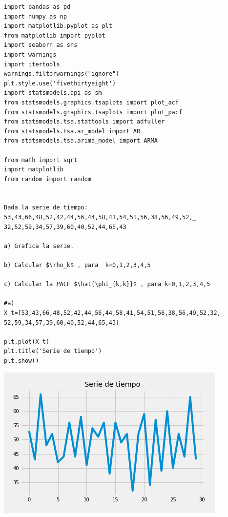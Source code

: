 \documentclass{article}
\begin{document}
\begin{verbatim}
import pandas as pd
import numpy as np
import matplotlib.pyplot as plt
from matplotlib import pyplot
import seaborn as sns
import warnings
import itertools
warnings.filterwarnings("ignore")
plt.style.use('fivethirtyeight')
import statsmodels.api as sm
from statsmodels.graphics.tsaplots import plot_acf
from statsmodels.graphics.tsaplots import plot_pacf
from statsmodels.tsa.stattools import adfuller
from statsmodels.tsa.ar_model import AR
from statsmodels.tsa.arima_model import ARMA

from math import sqrt
import matplotlib
from random import random


Dada la serie de tiempo:
53,43,66,48,52,42,44,56,44,58,41,54,51,56,38,56,49,52,_
32,52,59,34,57,39,60,40,52,44,65,43

a) Grafica la serie.

b) Calcular $\rho_k$ , para  k=0,1,2,3,4,5

c) Calcular la PACF $\hat{\phi_{k,k}}$ , para k=0,1,2,3,4,5

#a)
X_t=[53,43,66,48,52,42,44,56,44,58,41,54,51,56,38,56,49,52,32,_
52,59,34,57,39,60,40,52,44,65,43]

plt.plot(X_t)
plt.title('Serie de tiempo')
plt.show()
\end{verbatim}

\includegraphics{Serie.png}
\end{document}
